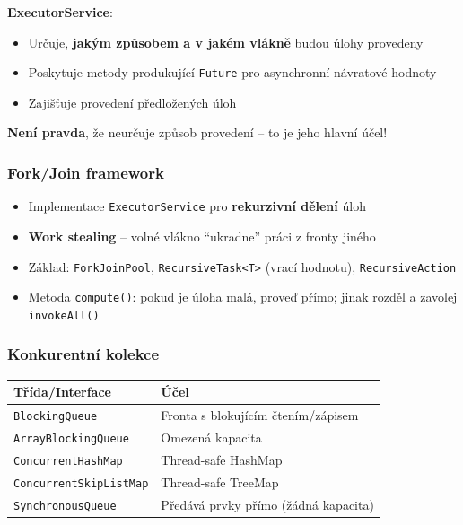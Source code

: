 \documentclass[11pt,a4paper]{article}
\begin{document}
\begin{tcolorbox}[warnbox,title=Otázka ze vzorového testu!]
\textbf{ExecutorService}:
\begin{itemize}
    \item Určuje, \textbf{jakým způsobem a v jakém vlákně} budou úlohy provedeny
    \item Poskytuje metody produkující \texttt{Future} pro asynchronní návratové hodnoty
    \item Zajišťuje provedení předložených úloh
\end{itemize}
\textbf{Není pravda}, že neurčuje způsob provedení -- to je jeho hlavní účel!
\end{tcolorbox}

\subsubsection{Fork/Join framework}

\begin{itemize}
    \item Implementace \texttt{ExecutorService} pro \textbf{rekurzivní dělení} úloh
    \item \textbf{Work stealing} -- volné vlákno ``ukradne'' práci z fronty jiného
    \item Základ: \texttt{ForkJoinPool}, \texttt{RecursiveTask<T>} (vrací hodnotu), \texttt{RecursiveAction}
    \item Metoda \texttt{compute()}: pokud je úloha malá, proveď přímo; jinak rozděl a zavolej \texttt{invokeAll()}
\end{itemize}

\subsubsection{Konkurentní kolekce}

\begin{center}
\begin{tabular}{ll}
\toprule
\textbf{Třída/Interface} & \textbf{Účel} \\
\midrule
\texttt{BlockingQueue} & Fronta s blokujícím čtením/zápisem \\
\texttt{ArrayBlockingQueue} & Omezená kapacita \\
\texttt{ConcurrentHashMap} & Thread-safe HashMap \\
\texttt{ConcurrentSkipListMap} & Thread-safe TreeMap \\
\texttt{SynchronousQueue} & Předává prvky přímo (žádná kapacita) \\
\bottomrule
\end{tabular}
\end{center}
\end{document}
